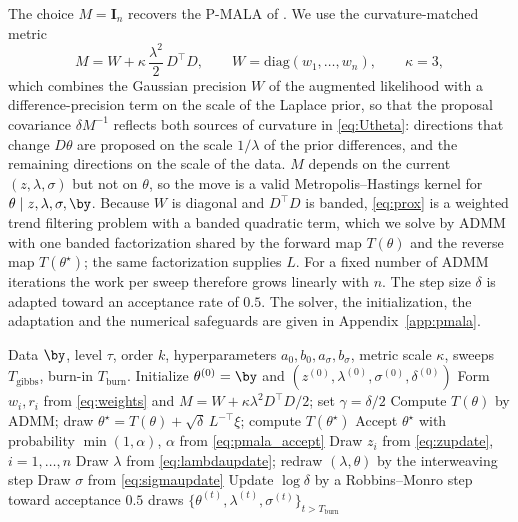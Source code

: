The choice $M = \mathbf{I}_n$ recovers the P-MALA of \citet{pereyra2016proximal}. We use the curvature-matched metric
\begin{equation}
    M = W + \kappa\, \frac{\lambda^2}{2}\, D^\top D, \qquad W = \mathrm{diag}(w_1, \ldots, w_n), \qquad \kappa = 3,
    \label{eq:metric}
\end{equation}
which combines the Gaussian precision $W$ of the augmented likelihood with a difference-precision term on the scale of the Laplace prior, so that the proposal covariance $\delta M^{-1}$ reflects both sources of curvature in \eqref{eq:Utheta}: directions that change $D\theta$ are proposed on the scale $1/\lambda$ of the prior differences, and the remaining directions on the scale of the data. $M$ depends on the current $(z, \lambda, \sigma)$ but not on $\theta$, so the move is a valid Metropolis--Hastings kernel for $\theta \mid z, \lambda, \sigma, \by$. Because $W$ is diagonal and $D^\top D$ is banded, \eqref{eq:prox} is a weighted trend filtering problem with a banded quadratic term, which we solve by ADMM with one banded factorization shared by the forward map $T(\theta)$ and the reverse map $T(\theta^\star)$; the same factorization supplies $L$. For a fixed number of ADMM iterations the work per sweep therefore grows linearly with $n$. The step size $\delta$ is adapted toward an acceptance rate of $0.5$. The solver, the initialization, the adaptation and the numerical safeguards are given in Appendix~\ref{app:pmala}.

\begin{algorithm}[h!]
\caption{Bayesian-PMALA for a single quantile level $\tau$}
\label{alg:pmala}
\begin{algorithmic}[1]
\Require Data $\by$, level $\tau$, order $k$, hyperparameters $a_0, b_0, a_\sigma, b_\sigma$, metric scale $\kappa$, sweeps $T_{\mathrm{gibbs}}$, burn-in $T_{\mathrm{burn}}$.
\State Initialize $\theta^{(0)} = \by$ and $(z^{(0)}, \lambda^{(0)}, \sigma^{(0)}, \delta^{(0)})$ 
    \State Form $w_i, r_i$ from \eqref{eq:weights} and $M = W + \kappa\lambda^2 D^\top D/2$; set $\gamma = \delta/2$
    \State Compute $T(\theta)$ by ADMM; draw $\theta^\star = T(\theta) + \sqrt{\delta}\,L^{-\top}\xi$; compute $T(\theta^\star)$
    \State Accept $\theta^\star$ with probability $\min(1,\alpha)$, $\alpha$ from \eqref{eq:pmala_accept}
    \State Draw $z_i$ from \eqref{eq:zupdate}, $i = 1, \ldots, n$
    \State Draw $\lambda$ from \eqref{eq:lambdaupdate}; redraw $(\lambda, \theta)$ by the interweaving step
    \State Draw $\sigma$ from \eqref{eq:sigmaupdate}
    \State Update $\log\delta$ by a Robbins--Monro step toward acceptance $0.5$
\EndFor
\State \Return draws $\{\theta^{(t)}, \lambda^{(t)}, \sigma^{(t)}\}_{t > T_{\mathrm{burn}}}$
\end{algorithmic}
\end{algorithm}

